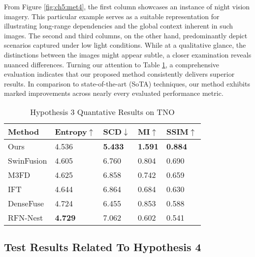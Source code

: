 From Figure \ref{fig:ch5:met4}, the first column showcases an instance of night vision imagery. This particular example serves as a suitable representation for illustrating long-range dependencies and the global context inherent in such images. The second and third columns, on the other hand, predominantly depict scenarios captured under low light conditions. While at a qualitative glance, the distinctions between the images might appear subtle, a closer examination reveals nuanced differences. Turning our attention to Table \ref{tab:ch5:met4}, a comprehensive evaluation indicates that our proposed method consistently delivers superior results. In comparison to state-of-the-art (SoTA) techniques, our method exhibits marked improvements across nearly every evaluated performance metric.

\begin{table}[htbp]
    \centering
    \caption{Hypothesis 3 Quantative Results on TNO}
    \label{tab:ch5:met4}
    \begin{tabular}{|l|l|l|l|l|}
        \hline
        \textbf{Method} & \textbf{Entropy\cite{roberts2008assessment}$\uparrow$ } & \textbf{SCD\cite{aslantas2015new}$\downarrow$} & \textbf{MI\cite{qu2002information}$\uparrow$} & \textbf{SSIM\cite{ma2015perceptual}$\uparrow$} \\ \hline
        Ours            & 4.536                & \textbf{5.433}       & \textbf{1.591}           &\textbf{0.884}             \\ \hline
        SwinFusion\cite{ma2022swinfusion}           & 4.605                & 6.760       & 0.804           & 0.690             \\ \hline
        M3FD\cite{liu2022target}           & 4.625                & 6.858       & 0.742           & 0.659             \\ \hline
        IFT\cite{vs2022image}           & 4.644                & 6.864       & 0.684           & 0.630             \\ \hline
        DenseFuse\cite{li2019infrared}           & 4.724                & 6.455       & 0.853           & 0.588             \\ \hline
        RFN-Nest\cite{li2021rfn}            & \textbf{4.729}                & 7.062       & 0.602           & 0.541             \\ \hline
    \end{tabular}
\end{table}

\subsection{Test Results Related To Hypothesis 4} \label{subsec:met5res}

